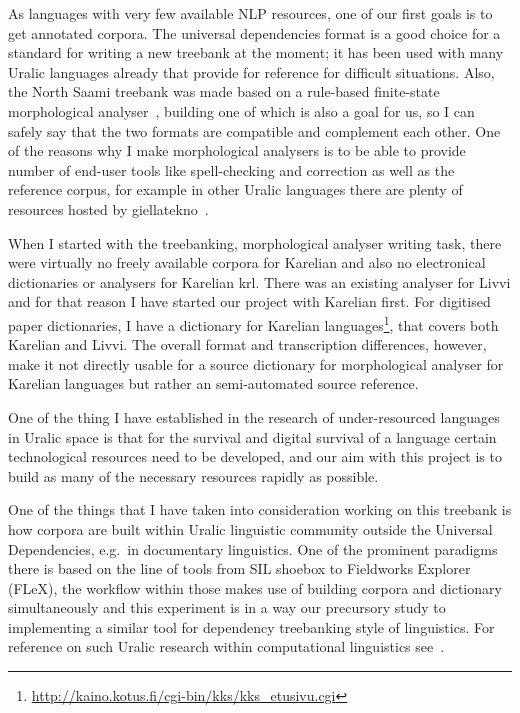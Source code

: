 \documentclass[11pt]{article}
\begin{document}
As languages with very few available NLP resources, one of our first goals is to
get annotated corpora. The universal dependencies format is a good choice for a
standard for writing a new treebank at the moment; it has been used with many
Uralic languages already that provide for reference for difficult situations.
Also, the North Saami treebank was made based on a rule-based finite-state
morphological analyser~\cite{sheyanova2017annotation}, building one of which is
also a goal for us, so I can safely say that the two formats are compatible and
complement each other.  One of the reasons why  I make morphological analysers
is to be able to provide number of end-user tools like spell-checking and
correction as well as the reference corpus, for example in other Uralic
languages there are plenty of resources hosted by
giellatekno~\cite{moshagen2014open}.

When I started with the treebanking, morphological analyser writing task, there
were virtually no freely available corpora for Karelian and also no electronical
dictionaries or analysers for Karelian krl. There was an existing analyser for
Livvi and for that reason I have started our project with Karelian first. For
digitised paper dictionaries, I have a dictionary for Karelian
languages\footnote{\url{http://kaino.kotus.fi/cgi-bin/kks/kks_etusivu.cgi}},
that covers both Karelian and Livvi. The overall format and transcription
differences, however, make it not directly usable for a source dictionary for
morphological analyser for Karelian languages but rather an semi-automated
source reference.

One of the thing I have established in the research of under-resourced
languages in Uralic space is that for the survival and digital survival of
a language certain technological resources need to be developed, and our
aim with this project is to build as many of the necessary resources rapidly as
possible.

One of the things that I have taken into consideration working on this
treebank is how corpora are built within Uralic linguistic community
outside the Universal Dependencies, e.g.\ in documentary linguistics.
One of the prominent paradigms there is based on the line of tools
from SIL shoebox to Fieldworks Explorer (FLeX), the workflow within
those makes use of building corpora and dictionary simultaneously
and this experiment is in a way our precursory study to implementing
a similar tool for dependency treebanking style of linguistics. For reference on
such Uralic research within computational linguistics
see~\cite{blokland2015language}.
\end{document}
